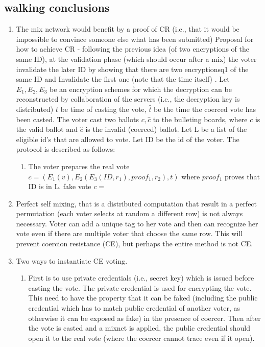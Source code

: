 \documentclass[]{paper}
\begin{document}
	\subsection{ walking conclusions}
	\begin{enumerate}
		\item The mix network would benefit by a proof of CR (i.e., that it would be impossible to convince someone else what has been submitted)
	Proposal for how to achieve CR - following the previous idea (of two encryptions of the same ID), at the validation phase (which should occur after a mix) the voter invalidate the later ID by showing that there are two encryptionsq1 of the same ID and Invalidate the first one (note that the time itself) . Let $E_1,E_2,E_3$ be an encryption schemes for which the decryption can be reconstructed by collaboration of the servers (i.e., the decryption key is distributed) $t$ be time of casting the vote, $\hat{t}$ be the time the coerced vote has been casted. The voter cast two ballots $c,\hat{c}$ to the bulleting boards, where $c$ is the valid ballot and $\hat{c}$ is the invalid (coerced) ballot. Let L be a list of the eligible id's that are allowed to vote.
	Let ID be the id of the voter. The protocol is described as follows:
	\begin{enumerate}
		\item The voter prepares the real vote $c = (E_1(v), E_2(E_3(ID,r_1), proof_1, r_2), t)$ where $proof_1$ proves that ID is in L.  fake vote $c= $
	\end{enumerate}
	\item Perfect self mixing, that is a distributed computation that result in a perfect permutation (each voter selects at random a different row) is not always necessary. Voter can add a unique tag to her vote and then can recognize her vote even if there are multiple voter that choose the same row. This will prevent coercion resistance (CE), but perhaps the entire method is not CE.
	\item Two ways to instantiate CE voting.
	\begin{enumerate}
		\item First is to use private credentials (i.e., secret key)  which is issued before casting the vote. The private credential is used for encrypting the vote. This need to have the property that it can be faked (including the public credential which has to match public credential of another voter, as otherwise it can be exposed as fake) in the presence of coercer. Then after the vote is casted and a mixnet is applied, the public credential should open it to the real vote (where the coercer cannot trace even if it open). 

\end{enumerate}
\end{enumerate}
\end{document}
